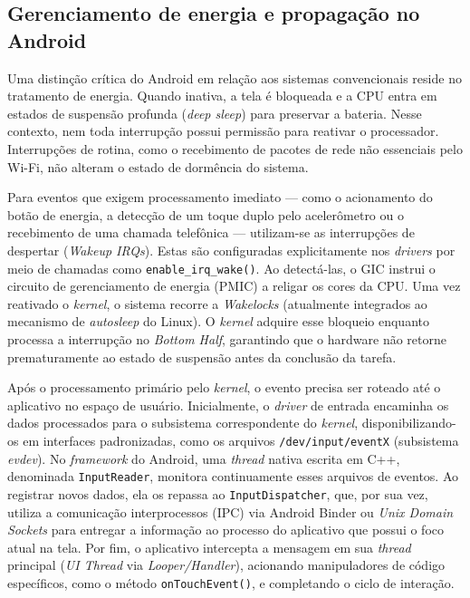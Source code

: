 \documentclass[12pt,a4paper]{article}
\begin{document}
\subsection{Gerenciamento de energia e propagação no Android}

Uma distinção crítica do Android em relação aos sistemas convencionais reside no
tratamento de energia. Quando inativa, a tela é bloqueada e a CPU entra em
estados de suspensão profunda (\emph{deep sleep}) para preservar a bateria.
Nesse contexto, nem toda interrupção possui permissão para reativar o
processador. Interrupções de rotina, como o recebimento de pacotes de rede não
essenciais pelo Wi-Fi, não alteram o estado de dormência do sistema.

Para eventos que exigem processamento imediato --- como o acionamento do botão
de energia, a detecção de um toque duplo pelo acelerômetro ou o recebimento de
uma chamada telefônica --- utilizam-se as interrupções de despertar
(\emph{Wakeup IRQs}). Estas são configuradas explicitamente nos \emph{drivers}
por meio de chamadas como \texttt{enable\_irq\_wake()}. Ao detectá-las, o GIC
instrui o circuito de gerenciamento de energia (PMIC) a religar os cores da CPU.
Uma vez reativado o \emph{kernel}, o sistema recorre a \emph{Wakelocks}
(atualmente integrados ao mecanismo de \emph{autosleep} do Linux). O
\emph{kernel} adquire esse bloqueio enquanto processa a interrupção no
\emph{Bottom Half}, garantindo que o hardware não retorne prematuramente ao
estado de suspensão antes da conclusão da tarefa.

Após o processamento primário pelo \emph{kernel}, o evento precisa ser roteado
até o aplicativo no espaço de usuário. Inicialmente, o \emph{driver} de entrada
encaminha os dados processados para o subsistema correspondente do
\emph{kernel}, disponibilizando-os em interfaces padronizadas, como os arquivos
\texttt{/dev/input/eventX} (subsistema \emph{evdev}). No \emph{framework} do
Android, uma \emph{thread} nativa escrita em C++, denominada
\texttt{InputReader}, monitora continuamente esses arquivos de eventos. Ao
registrar novos dados, ela os repassa ao \texttt{InputDispatcher}, que, por sua
vez, utiliza a comunicação interprocessos (IPC) via Android Binder ou \emph{Unix
Domain Sockets} para entregar a informação ao processo do aplicativo que possui
o foco atual na tela. Por fim, o aplicativo intercepta a mensagem em sua
\emph{thread} principal (\emph{UI Thread} via \emph{Looper/Handler}), acionando
manipuladores de código específicos, como o método \texttt{onTouchEvent()}, e
completando o ciclo de interação.
\end{document}
